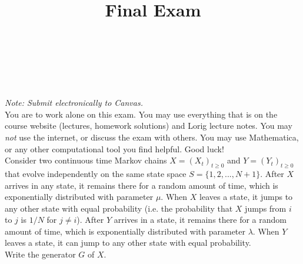 \documentclass[10pt]{amsart}
\begin{document}
\noindent
{} \\
 \\
 \\
\title{Final Exam}
\maketitle

{\it Note: Submit electronically to Canvas.}
\\

 You are to work alone on this exam. You may use everything that is on the course website (lectures, homework solutions) and Lorig lecture notes. You may {\it not} use the internet, or discuss the exam with others. You may use Mathematica, or any other computational tool you find helpful. Good luck! 
\\

 Consider two continuous time Markov chains $X=(X_t)_{t\geq0}$ and $Y=(Y_t)_{t\geq0}$ that evolve independently on the same state space $S=\{1,2,...,N+1\}$. After $X$ arrives in any state, it remains there for a random amount of time, which is exponentially distributed with parameter $\mu$. When $X$ leaves a state, it jumps to any other state with equal probability (i.e. the probability that $X$ jumps from $i$ to $j$ is $1/N$ for $j \neq i$). After $Y$ arrives in a state, it remains there for a random amount of time, which is exponentially distributed with parameter $\lambda$. When $Y$ leaves a state, it can jump to any other state with equal probability. 
\\

 Write the generator $G$ of $X$. \\
\end{document}
